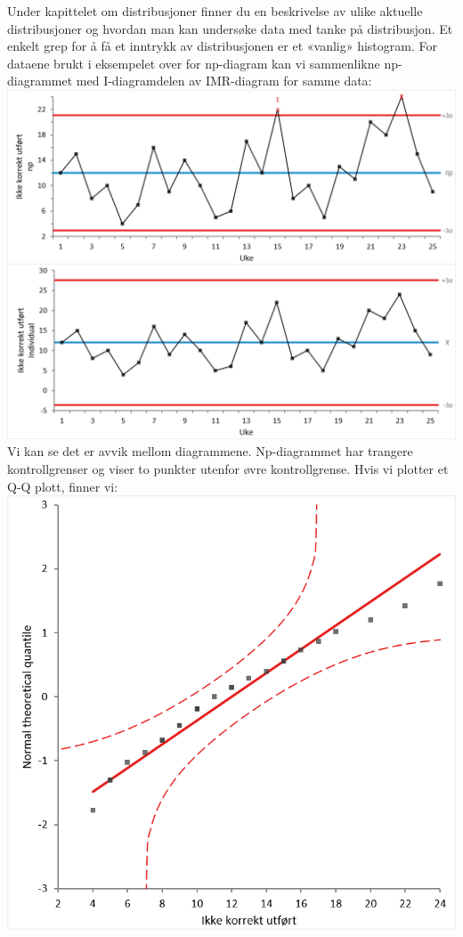 \documentclass[
]{book}
\begin{document}
Under kapittelet om distribusjoner finner du en beskrivelse av ulike aktuelle distribusjoner og hvordan man kan undersøke data med tanke på distribusjon. Et enkelt grep for å få et inntrykk av distribusjonen er et «vanlig» histogram. For dataene brukt i eksempelet over for np-diagram kan vi sammenlikne np-diagrammet med I-diagramdelen av IMR-diagram for samme data:
\includegraphics{npimr.png}
Vi kan se det er avvik mellom diagrammene. Np-diagrammet har trangere kontrollgrenser og viser to punkter utenfor øvre kontrollgrense. Hvis vi plotter et Q-Q plott, finner vi:
\includegraphics{qqnpi.png}
\end{document}

